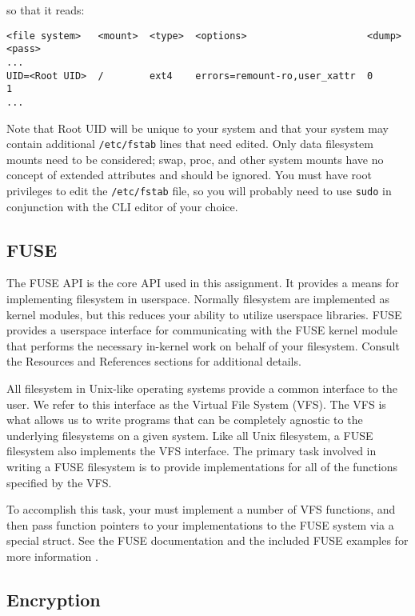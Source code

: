 \documentclass[12pt]{article}
\begin{document}
so that it reads:

\begin{verbatim}
<file system>   <mount>  <type>  <options>                     <dump>  <pass> 
...
UID=<Root UID>  /        ext4    errors=remount-ro,user_xattr  0       1
...
\end{verbatim}

Note that Root UID will be unique to your system and that your
system may contain additional \texttt{/etc/fstab} lines that need
edited. Only data filesystem mounts need to be considered; swap, proc, and
other system mounts have no concept of extended attributes and should
be ignored. You must have root privileges to edit the
\texttt{/etc/fstab} file, so you will probably need to use
\texttt{sudo} in conjunction with the CLI editor of your choice.

\subsection{FUSE}

The FUSE API\cite{fuse-refs} is the core API used in this
assignment. It provides a means for implementing filesystem in
userspace. Normally filesystem are implemented as kernel modules, but
this reduces your ability to utilize userspace libraries. FUSE
provides a userspace interface for communicating with the FUSE kernel
module that performs the necessary in-kernel work on behalf of your
filesystem. Consult the Resources and References sections for additional
details.

All filesystem in Unix-like operating systems provide a common
interface to the user. We refer to this interface as the Virtual File
System (VFS)\cite{linux-vfs}. The VFS is what allows us to write
programs that can be completely agnostic to the underlying filesystems
on a given system. Like all Unix filesystem, a FUSE filesystem also
implements the VFS interface. The primary task involved in writing a
FUSE filesystem is to provide implementations for all of the functions
specified by the VFS.

To accomplish this task, your must implement a number of VFS functions,
and then pass function pointers to your implementations to the FUSE
system via a special struct. See the FUSE documentation and the included
FUSE examples for more information
\cite{fuse-website,fuse-refs,fuse-wiki,pfeiffer-fuse}.

\subsection{Encryption}
\end{document}

